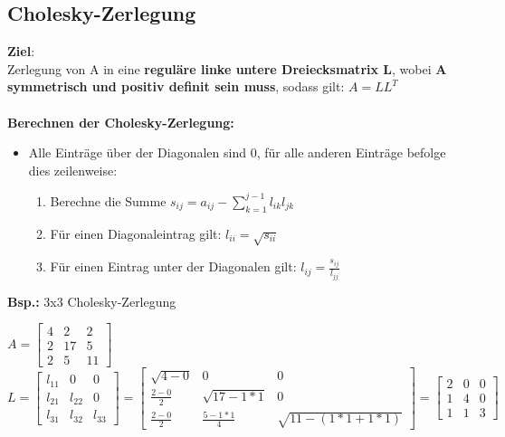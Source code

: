 \subsection{Cholesky-Zerlegung}%
\label{zerl:sub:cholesky}
\textbf{Ziel}:\\Zerlegung von A in eine \textbf{reguläre linke untere Dreiecksmatrix L}, wobei \textbf{A symmetrisch und positiv definit sein muss}, sodass gilt: $A = LL^T$\\\\
\textbf{Berechnen der Cholesky-Zerlegung:}
\begin{itemize}
	\item Alle Einträge über der Diagonalen sind 0, für alle anderen Einträge befolge dies zeilenweise:
	\begin{enumerate}
		\item Berechne die Summe $s_{ij} = a_{ij} - \sum_{k = 1}^{j - 1} l_{ik}l_{jk}$
		\item Für einen Diagonaleintrag gilt: $l_{ii} = \sqrt{s_{ii}}$ 
		\item Für einen Eintrag unter der Diagonalen gilt: $l_{ij} = \frac{s_{ij}}{l_{jj}}$
	\end{enumerate}
\end{itemize}
\textbf{Bsp.:} 3x3 Cholesky-Zerlegung
\begin{center}
	$A 	= \begin{bmatrix}
			4 & 2 & 2\\
			2 & 17 & 5\\
			2 & 5 & 11
		\end{bmatrix}$\\
		\vspace*{0.5cm}
	$L 	= \begin{bmatrix}
			l_{11} & 0 & 0\\
			l_{21} & l_{22} & 0\\
			l_{31} & l_{32} & l_{33}
		\end{bmatrix}
		= \begin{bmatrix}
	  		\sqrt{4 - 0} & 0 & 0\\
	  		\frac{2 - 0}{2} & \sqrt{17 - 1 * 1} & 0\\
	  		\frac{2 - 0}{2} & \frac{5 - 1 * 1}{4} & \sqrt{11 - (1 * 1 + 1 * 1)}
			\end{bmatrix}
			= \begin{bmatrix}
 			2 & 0 & 0\\
 			1 & 4 & 0\\
 			1 & 1 & 3
			\end{bmatrix}$
\end{center}
